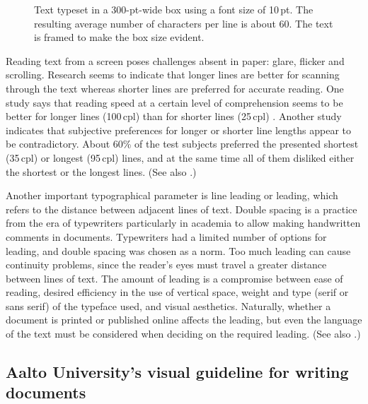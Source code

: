\documentclass[english, 12pt, a4paper, sci, utf8, a-2b, online]{aaltothesis}
\begin{document}
\begin{figure}[b]
	\centering
	\caption{Text typeset in a 300-pt-wide box using a font size of 10\,pt. The 
		resulting average number of characters per line is about 60. The text is
		framed to make the box size evident.}
\end{figure}

Reading text from a screen poses challenges absent in paper: glare, flicker and 
scrolling. Research seems to indicate that longer lines are better for scanning 
through the text whereas shorter lines are preferred for accurate reading. One 
study says that reading speed at a certain level of comprehension seems to be 
better for longer lines (100\,cpl) than for shorter lines (25\,cpl) 
\cite{Dyson}. Another study \cite{Shaik} indicates that subjective preferences 
for longer or shorter line lengths appear to be contradictory. About 60\% of 
the test subjects preferred the presented shortest (35\,cpl) or longest 
(95\,cpl) lines, and at the same time all of them disliked either the 
shortest or the longest lines. (See also \cite{Wikilinelength}.)

Another important typographical parameter is line leading or leading, which 
refers to the distance between adjacent lines of text. Double spacing is a 
practice from the era of typewriters particularly in academia to allow making 
handwritten comments in documents. Typewriters had a limited number of options 
for leading, and double spacing was chosen as a norm. Too much leading can cause
continuity problems, since the reader’s eyes must travel a greater distance 
between lines of text. The amount of leading is a compromise between ease of 
reading, desired efficiency in the use of vertical space, weight and type (serif
or sans serif) of the typeface used, and visual aesthetics. Naturally, whether a
document is printed or published online affects the leading, but even the 
language of the text must be considered when deciding on the required leading. 
(See also \cite{enwiki:1026690618}.)

\subsection*{Aalto University’s visual guideline for writing documents}
\end{document}
